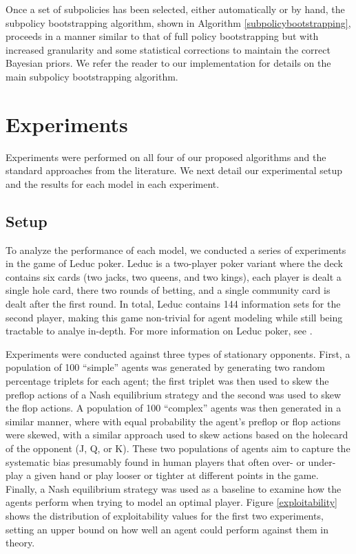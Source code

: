 \documentclass{aamas2013}
\begin{document}
    Once a set of subpolicies has been selected, either automatically or by hand, the subpolicy bootstrapping algorithm, shown in Algorithm \ref{subpolicybootstrapping}, proceeds in a manner similar to that of full policy bootstrapping but with increased granularity and some statistical corrections to maintain the correct Bayesian priors. We refer the reader to our implementation for details on the main subpolicy bootstrapping algorithm.

\section{Experiments}
Experiments were performed on all four of our proposed algorithms and the standard approaches from the literature. We next detail our experimental setup and the results for each model in each experiment.

    \subsection{Setup}
    To analyze the performance of each model, we conducted a series of experiments in the game of Leduc poker. Leduc is a two-player poker variant where the deck contains six cards (two jacks, two queens, and two kings), each player is dealt a single hole card, there two rounds of betting, and a single community card is dealt after the first round. In total, Leduc contains 144 information sets for the second player, making this game non-trivial for agent modeling while still being tractable to analye in-depth. For more information on Leduc poker, see \cite{bayesbluff}.

    Experiments were conducted against three types of stationary opponents. First, a population of 100 ``simple'' agents was generated by generating two random percentage triplets for each agent; the first triplet was then used to skew the preflop actions of a Nash equilibrium strategy and the second was used to skew the flop actions. A population of 100 ``complex'' agents was then generated in a similar manner, where with equal probability the agent's preflop or flop actions were skewed, with a similar approach used to skew actions based on the holecard of the opponent (J, Q, or K). These two populations of agents aim to capture the systematic bias presumably found in human players that often over- or under- play a given hand or play looser or tighter at different points in the game. Finally, a Nash equilibrium strategy was used as a baseline to examine how the agents perform when trying to model an optimal player. Figure \ref{exploitability} shows the distribution of exploitability values for the first two experiments, setting an upper bound on how well an agent could perform against them in theory.
\end{document}
